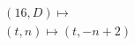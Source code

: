 \documentclass[preview]{standalone}
\begin{document}
\begin{align*}
&(16,D) \mapsto \\& (t,n) \mapsto (t, -n + 2)
\end{align*}
\end{document}
